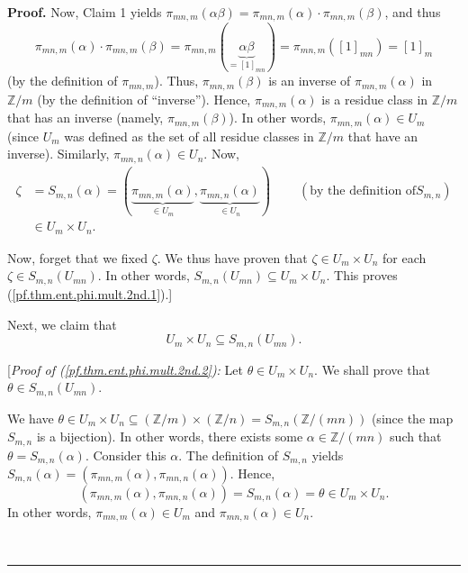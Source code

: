 \documentclass[numbers=enddot,12pt,final,onecolumn,notitlepage]{scrartcl}%
\numberwithin{exer}{subsection}
\theoremstyle{definition}
\newenvironment{proof}[1][Proof]{\noindent\textbf{#1.} }{\ \rule{0.5em}{0.5em}}
\begin{document}
\begin{proof}
Now, Claim 1 yields $\pi_{mn,m}\left(  \alpha\beta\right)  =\pi_{mn,m}\left(
\alpha\right)  \cdot\pi_{mn,m}\left(  \beta\right)  $, and thus%
\[
\pi_{mn,m}\left(  \alpha\right)  \cdot\pi_{mn,m}\left(  \beta\right)
=\pi_{mn,m}\left(  \underbrace{\alpha\beta}_{=\left[  1\right]  _{mn}}\right)
=\pi_{mn,m}\left(  \left[  1\right]  _{mn}\right)  =\left[  1\right]  _{m}%
\]
(by the definition of $\pi_{mn,m}$). Thus, $\pi_{mn,m}\left(  \beta\right)  $
is an inverse of $\pi_{mn,m}\left(  \alpha\right)  $ in $\mathbb{Z}/m$ (by the
definition of \textquotedblleft inverse\textquotedblright). Hence, $\pi
_{mn,m}\left(  \alpha\right)  $ is a residue class in $\mathbb{Z}/m$ that has
an inverse (namely, $\pi_{mn,m}\left(  \beta\right)  $). In other words,
$\pi_{mn,m}\left(  \alpha\right)  \in U_{m}$ (since $U_{m}$ was defined as the
set of all residue classes in $\mathbb{Z}/m$ that have an inverse). Similarly,
$\pi_{mn,n}\left(  \alpha\right)  \in U_{n}$. Now,
\begin{align*}
\zeta &  =S_{m,n}\left(  \alpha\right)  =\left(  \underbrace{\pi_{mn,m}\left(
\alpha\right)  }_{\in U_{m}},\underbrace{\pi_{mn,n}\left(  \alpha\right)
}_{\in U_{n}}\right)  \ \ \ \ \ \ \ \ \ \ \left(  \text{by the definition of
}S_{m,n}\right) \\
&  \in U_{m}\times U_{n}.
\end{align*}


Now, forget that we fixed $\zeta$. We thus have proven that $\zeta\in
U_{m}\times U_{n}$ for each $\zeta\in S_{m,n}\left(  U_{mn}\right)  $. In
other words, $S_{m,n}\left(  U_{mn}\right)  \subseteq U_{m}\times U_{n}$. This
proves (\ref{pf.thm.ent.phi.mult.2nd.1}).]

Next, we claim that%
\begin{equation}
U_{m}\times U_{n}\subseteq S_{m,n}\left(  U_{mn}\right)  .
\label{pf.thm.ent.phi.mult.2nd.2}%
\end{equation}


[\textit{Proof of (\ref{pf.thm.ent.phi.mult.2nd.2}):} Let $\theta\in
U_{m}\times U_{n}$. We shall prove that $\theta\in S_{m,n}\left(
U_{mn}\right)  $.

We have $\theta\in U_{m}\times U_{n}\subseteq\left(  \mathbb{Z}/m\right)
\times\left(  \mathbb{Z}/n\right)  =S_{m,n}\left(  \mathbb{Z}/\left(
mn\right)  \right)  $ (since the map $S_{m,n}$ is a bijection). In other
words, there exists some $\alpha\in\mathbb{Z}/\left(  mn\right)  $ such that
$\theta=S_{m,n}\left(  \alpha\right)  $. Consider this $\alpha$. The
definition of $S_{m,n}$ yields $S_{m,n}\left(  \alpha\right)  =\left(
\pi_{mn,m}\left(  \alpha\right)  ,\pi_{mn,n}\left(  \alpha\right)  \right)  $.
Hence,%
\[
\left(  \pi_{mn,m}\left(  \alpha\right)  ,\pi_{mn,n}\left(  \alpha\right)
\right)  =S_{m,n}\left(  \alpha\right)  =\theta\in U_{m}\times U_{n}.
\]
In other words, $\pi_{mn,m}\left(  \alpha\right)  \in U_{m}$ and $\pi
_{mn,n}\left(  \alpha\right)  \in U_{n}$.


\end{proof}
\end{document}
